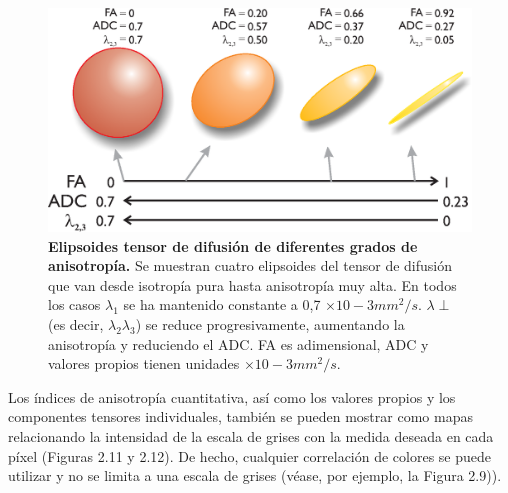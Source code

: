 \documentclass[12pt,a5,twoside]{book}
\begin{document}
\begin{figure}
	\centering
    \includegraphics [scale=0.7,center] {DTI_ellipsoids_FA.eps}
    \caption{\textbf{Elipsoides tensor de difusión de diferentes grados de anisotropía.} Se muestran cuatro elipsoides del tensor de difusión que van desde isotropía pura hasta anisotropía muy alta. En todos los casos $\lambda_{1}$ se ha mantenido constante a 0,7 $× 10 - 3 mm^{2}/s$. $\lambda\perp$ (es decir, $\lambda_{2} \lambda_{3}$) se reduce progresivamente, aumentando la anisotropía y reduciendo el ADC. FA es adimensional, ADC y valores propios tienen unidades $× 10 - 3 mm^{2}/s$.}
    \label{F:DTI_ellipsoids_FA}
\end{figure}

Los índices de anisotropía cuantitativa, así como los valores propios y los componentes tensores individuales, también se pueden mostrar como mapas relacionando la intensidad de la escala de grises con la medida deseada en cada píxel (Figuras 2.11 y 2.12). De hecho, cualquier correlación de colores se puede utilizar y no se limita a una escala de grises (véase, por ejemplo, la Figura 2.9)). 
\end{document}
